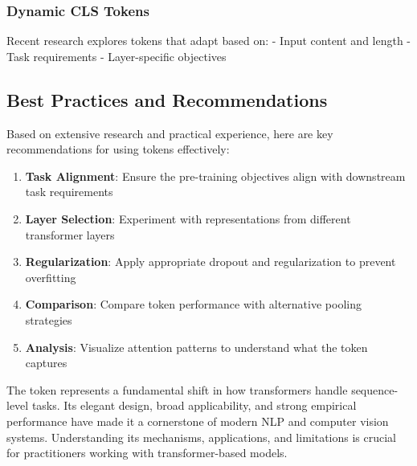 \begin{comment}
Feedback: Convert the above into latex items, with a little elaboration
\end{comment}

\subsubsection{Dynamic CLS Tokens}
Recent research explores \cls{} tokens that adapt based on:
- Input content and length
- Task requirements
- Layer-specific objectives

\begin{comment}
Feedback: Convert the above into latex items, with a little elaboration
\end{comment}

\subsection{Best Practices and Recommendations}

Based on extensive research and practical experience, here are key recommendations for using \cls{} tokens effectively:

\begin{principle}
\begin{enumerate}
\item \textbf{Task Alignment}: Ensure the pre-training objectives align with downstream task requirements
\item \textbf{Layer Selection}: Experiment with \cls{} representations from different transformer layers
\item \textbf{Regularization}: Apply appropriate dropout and regularization to prevent overfitting
\item \textbf{Comparison}: Compare \cls{} token performance with alternative pooling strategies
\item \textbf{Analysis}: Visualize attention patterns to understand what the \cls{} token captures
\end{enumerate}
\end{principle}
\begin{comment}
Feedback: This is a good list of principles, but it could be more actionable. For example, for "Task Alignment," you could add: "If your downstream task is very different from Next Sentence Prediction (e.g., fine-grained sentiment analysis), be aware that the [CLS] token's pre-trained representation may not be optimal and may require more aggressive fine-tuning." For "Layer Selection," you could suggest: "Start with the final layer's [CLS] token as a strong baseline, but if performance is suboptimal, consider concatenating or averaging the [CLS] representations from the last 2-4 layers, as this can sometimes provide a richer signal."
\end{comment}

The \cls{} token represents a fundamental shift in how transformers handle sequence-level tasks. Its elegant design, broad applicability, and strong empirical performance have made it a cornerstone of modern NLP and computer vision systems. Understanding its mechanisms, applications, and limitations is crucial for practitioners working with transformer-based models.